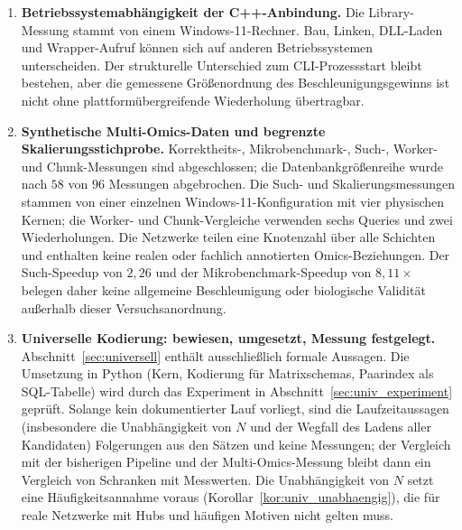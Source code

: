 \documentclass[a4paper,12pt, twoside]{report}
\theoremstyle{definition}
\begin{document}
\begin{enumerate}
	\item \textbf{Betriebssystemabhängigkeit der C++-Anbindung.} Die Library-Messung stammt von einem Windows-11-Rechner. Bau, Linken, DLL-Laden und Wrapper-Aufruf können sich auf anderen Betriebssystemen unterscheiden. Der strukturelle Unterschied zum CLI-Prozessstart bleibt bestehen, aber die gemessene Größenordnung des Beschleunigungsgewinns ist nicht ohne plattformübergreifende Wiederholung übertragbar.
	\item \textbf{Synthetische Multi-Omics-Daten und begrenzte Skalierungsstichprobe.} Korrektheits-, Mikrobenchmark-, Such-, Worker- und Chunk-Messungen sind abgeschlossen; die Datenbankgrößenreihe wurde nach $58$ von $96$ Messungen abgebrochen. Die Such- und Skalierungsmessungen stammen von einer einzelnen Windows-11-Konfiguration mit vier physischen Kernen; die Worker- und Chunk-Vergleiche verwenden sechs Queries und zwei Wiederholungen. Die Netzwerke teilen eine Knotenzahl über alle Schichten und enthalten keine realen oder fachlich annotierten Omics-Beziehungen. Der Such-Speedup von $2{,}26$ und der Mikrobenchmark-Speedup von $8{,}11\times$ belegen daher keine allgemeine Beschleunigung oder biologische Validität außerhalb dieser Versuchsanordnung.
	\item \textbf{Universelle Kodierung: bewiesen, umgesetzt, Messung festgelegt.} Abschnitt~\ref{sec:universell} enthält ausschließlich formale Aussagen. Die Umsetzung in Python (Kern, Kodierung für Matrixschemas, Paarindex als SQL-Tabelle) wird durch das Experiment in Abschnitt~\ref{sec:univ_experiment} geprüft. Solange kein dokumentierter Lauf vorliegt, sind die Laufzeitaussagen (insbesondere die Unabhängigkeit von $N$ und der Wegfall des Ladens aller Kandidaten) Folgerungen aus den Sätzen und keine Messungen; der Vergleich mit der bisherigen Pipeline und der Multi-Omics-Messung bleibt dann ein Vergleich von Schranken mit Messwerten. Die Unabhängigkeit von $N$ setzt eine Häufigkeitsannahme voraus (Korollar~\ref{kor:univ_unabhaengig}), die für reale Netzwerke mit Hubs und häufigen Motiven nicht gelten muss.

\end{enumerate}
\end{document}
